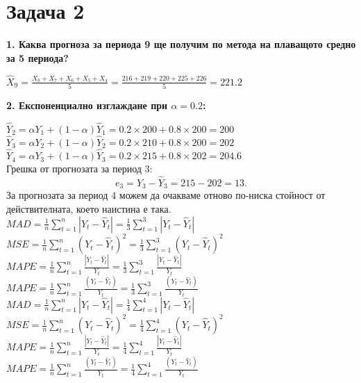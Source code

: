 \documentclass{article}
\begin{document}
\section*{Задача 2}
\begin{flushleft}

\textbf{1. Каква прогноза за периода 9 ще получим по метода на плаващото средно за 5 периода?}
\begin{flushleft}
$\widehat{X}_9 = \frac{X_8 + X_7 + X_6 + X_5 + X_4}{5} = \frac{216 + 219 + 220 + 225 + 226}{5} = 221.2$
\end{flushleft}

\textbf{2. Експоненциално изглаждане при $\alpha = 0.2$:}
\begin{flushleft}
$\widehat{Y}_2 = \alpha Y_1 + (1 - \alpha) \widehat{Y}_1 = 0.2\times200 + 0.8\times200 = 200$ \\
$\widehat{Y}_3 = \alpha Y_2 + (1 - \alpha) \widehat{Y}_2 = 0.2\times210 + 0.8\times200 = 202$ \\
$\widehat{Y}_4 = \alpha Y_3 + (1 - \alpha) \widehat{Y}_3 = 0.2\times215 + 0.8\times202 = 204.6$ \\
Грешка от прогнозата за период 3: $$e_3 = Y_3 - \widehat{Y}_3 = 215 - 202 = 13.$$
За прогнозата за период 4 можем да очакваме отново по-ниска стойност от действителната, което наистина е така. \\
$MAD = \frac{1}{n} \sum_{t=1}^{n} |Y_t - \widehat{Y}_t| = \frac{1}{3} \sum_{t=1}^{3} |Y_t - \widehat{Y}_t|$ \\
$MSE = \frac{1}{n} \sum_{t=1}^{n} (Y_t - \widehat{Y}_t)^2 = \frac{1}{3} \sum_{t=1}^{3} (Y_t - \widehat{Y}_t)^2$ \\
$MAPE = \frac{1}{n} \sum_{t=1}^{n} \frac{|Y_t - \widehat{Y}_t|}{Y_t} = \frac{1}{3} \sum_{t=1}^{3} \frac{|Y_t - \widehat{Y}_t|}{Y_t}$ \\
$MAPE = \frac{1}{n} \sum_{t=1}^{n} \frac{(Y_t - \widehat{Y}_t)}{Y_t} = \frac{1}{3} \sum_{t=1}^{3} \frac{(Y_t - \widehat{Y}_t)}{Y_t}$ \\

$MAD = \frac{1}{n} \sum_{t=1}^{n} |Y_t - \widehat{Y}_t| = \frac{1}{4} \sum_{t=1}^{4} |Y_t - \widehat{Y}_t|$ \\
$MSE = \frac{1}{n} \sum_{t=1}^{n} (Y_t - \widehat{Y}_t)^2 = \frac{1}{4} \sum_{t=1}^{4} (Y_t - \widehat{Y}_t)^2$ \\
$MAPE = \frac{1}{n} \sum_{t=1}^{n} \frac{|Y_t - \widehat{Y}_t|}{Y_t} = \frac{1}{4} \sum_{t=1}^{4} \frac{|Y_t - \widehat{Y}_t|}{Y_t}$ \\
$MAPE = \frac{1}{n} \sum_{t=1}^{n} \frac{(Y_t - \widehat{Y}_t)}{Y_t} = \frac{1}{4} \sum_{t=1}^{4} \frac{(Y_t - \widehat{Y}_t)}{Y_t}$ \\
\end{flushleft}


\end{flushleft}
\end{document}
